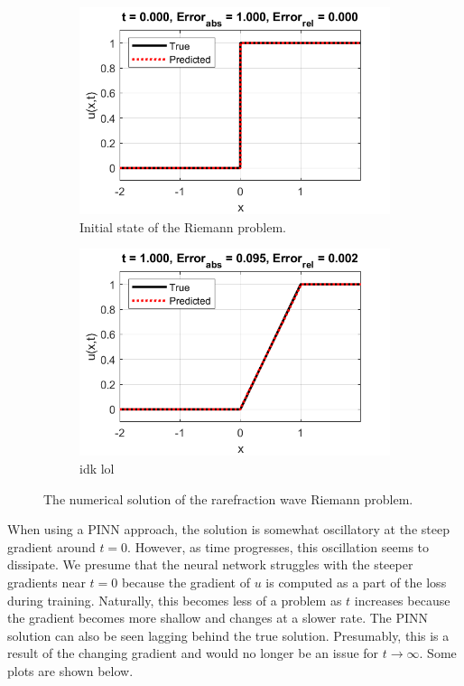 \documentclass{myproject}
\begin{document}
\begin{figure}
\centering
    \begin{subfigure}{.48\textwidth}
        \centering
        \includegraphics[width=1.0\textwidth]{t0_rarefraction.png}
        \caption{Initial state of the Riemann problem.}
    \end{subfigure}\hfill
    \begin{subfigure}{.48\textwidth}
        \centering
        \includegraphics[width=1\textwidth]{t1_rarefraction.png}
        \caption{idk lol}
    \end{subfigure}
    \caption{The numerical solution of the rarefraction wave Riemann problem.}
\end{figure}

When using a PINN approach, the solution is somewhat oscillatory at the steep gradient around $t=0$. However, as time progresses, this oscillation seems to dissipate. We presume that the neural network struggles with the steeper gradients near $t=0$ because the gradient of $u$ is computed as a part of the loss during training. Naturally, this becomes less of a problem as $t$ increases because the gradient becomes more shallow and changes at a slower rate. The PINN solution can also be seen lagging behind the true solution. Presumably, this is a result of the changing gradient and would no longer be an issue for $t \rightarrow \infty $. Some plots are shown below.
\end{document}
